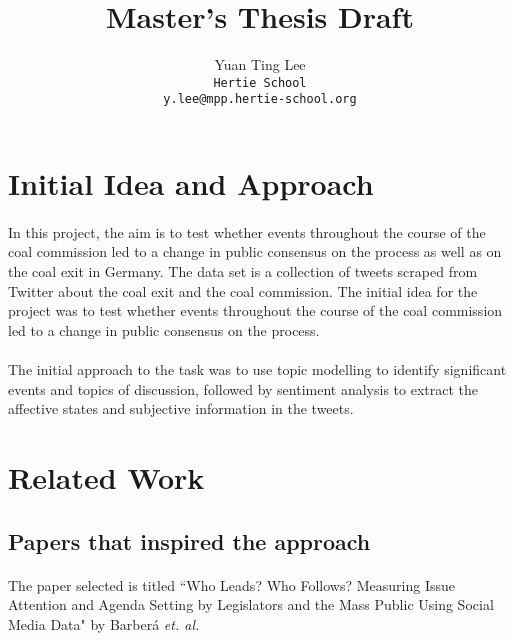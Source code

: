 \documentclass[10pt,twocolumn,letterpaper]{article}
\begin{document}
	
	\title{Master's Thesis Draft}
	
	\author{Yuan Ting Lee 
		\\{\tt\small Hertie School}
		\\{\tt\small y.lee@mpp.hertie-school.org}
	}
	
	\maketitle
	\section{Initial Idea and Approach}
	\paragraph{} In this project, the aim is to test whether events throughout the course of the coal commission led to a change in public consensus on the process as well as on the coal exit in Germany. The data set is a collection of tweets scraped from Twitter about the coal exit and the coal commission. The initial idea for the project was to test whether events throughout the course of the coal commission led to a change in public consensus on the process. 
	
	\paragraph{} The initial approach to the task was to use topic modelling to identify significant events and topics of discussion, followed by sentiment analysis to extract the affective states and subjective information in the tweets. 
	
	\section{Related Work}
	\subsection{Papers that inspired the approach}
	\paragraph{} The paper selected is titled ``Who Leads? Who Follows? Measuring Issue Attention and Agenda Setting by Legislators and the Mass Public Using Social Media Data" by Barberá \emph{et. al.} \cite{barberá_2019}
	
\end{document}
